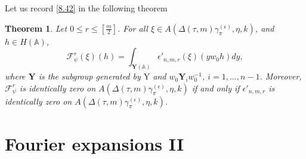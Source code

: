 \documentclass[12pts]{amsart}
\newcommand{\BA}{{\mathbb {A}}}
\newtheorem{thm}{Theorem}[section]
\begin{document}
Let us record \eqref{8.42} in the following theorem
\begin{thm}\label{thm 8.10}
Let $0\leq r\leq [\frac{m}{2}]$. For all $\xi\in A(\Delta(\tau,m)\gamma_\pi^{(\epsilon)},\eta,k)$, and $h\in H(\BA)$,  
$$
\mathcal{F}_\psi^r(\xi)(h)=\int_{\mathbf{Y}(\BA)}\epsilon'_{n,m,r}(\xi)(yw_0h)dy,
$$
where $\mathbf{Y}$ is the subgroup generated by $\mathrm{Y}$ and $w_0\mathbf{Y}_iw_0^{-1}$, $i=1,...,n-1$.
Moreover, $\mathcal{F}_\psi^r$ is identically zero on $A(\Delta(\tau,m)\gamma_\pi^{(\epsilon)},\eta,k)$ if and only if $\epsilon'_{n,m,r}$
is identically zero on $A(\Delta(\tau,m)\gamma_\pi^{(\epsilon)},\eta,k)$.
\end{thm}






\section{Fourier expansions II}
\end{document}
